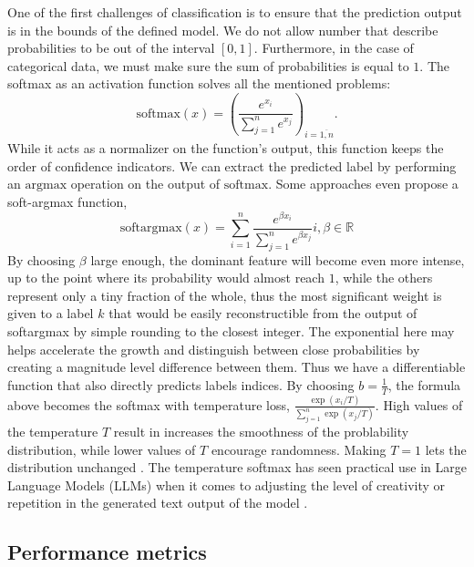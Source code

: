 One of the first challenges of classification is to ensure that the prediction output is in the bounds of the defined model. We do not allow number that describe probabilities to be out of the interval $[0,1]$. Furthermore, in the case of categorical data, we must make sure the sum of probabilities is equal to $1$. The softmax \cite{softmax} as an activation function solves all the mentioned problems:
$$\mathrm{softmax}(x)=\left(\frac{e^{x_i}}{\sum_{j=1}^n{e^{x_j}}}\right)_{i=\overline{1,n}}.$$
While it acts as a normalizer on the function's output, this function keeps the order of confidence indicators. We can extract the predicted label by performing an $\mathrm{argmax}$ operation on the output of $\mathrm{softmax}$. Some approaches \cite{softargmax} even propose a soft-argmax function,
$$\mathrm{softargmax}(x)=\sum_{i=1}^n\frac{e^{\beta x_i}}{\sum_{j=1}^n{e^{\beta x_j}}} i, \beta\in\mathbb{R}$$
By choosing $\beta$ large enough, the dominant feature will become even more intense, up to the point where its probability would almost reach $1$, while the others represent only a tiny fraction of the whole, thus the most significant weight is given to a label $k$ that would be easily reconstructible from the output of softargmax by simple rounding to the closest integer. The exponential here may helps accelerate the growth and distinguish between close probabilities by creating a magnitude level difference between them. Thus we have a differentiable function that also directly predicts labels indices. By choosing $b=\frac{1}{T}$, the formula above becomes the softmax with temperature loss, $\frac{\exp{(x_i/T)}}{\sum_{j=1}^ n{\exp{(x_j/T)}}}$. High values of the temperature $T$ result in increases the smoothness of the problability distribution, while lower values of $T$ encourage randomness. Making $T=1$ lets the distribution unchanged \cite{hinton2015distilling}. The temperature softmax has seen practical use in Large Language Models (LLMs) when it comes to adjusting the level of creativity or repetition in the generated text output of the model \cite{renze2024effect}.

\subsection{Performance metrics}
\label{subsubsec:ch3sec2subsec4subsubsec3}

